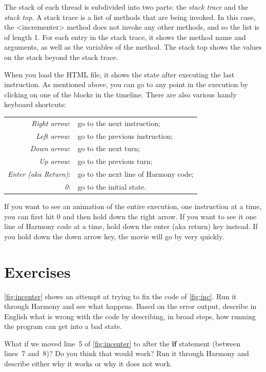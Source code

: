 \documentclass{report}
\begin{document}
The stack of each thread is subdivided into two parts: the
\emph{stack trace} and the \emph{stack top}.
A stack trace is a list of methods that are being invoked.
In this case, the <{incrementer}> method does not invoke any
other methods, and so the list is of length 1.
For each entry in the stack trace, it shows the method name and
arguments, as well as the variables of the method.
The stack top shows the values on the stack beyond the stack trace.

When you load the HTML file, it shows the state after executing
the last instruction.
As mentioned above, you can go to any point in the execution by
clicking on one of the blocks in the timeline.
There are also various handy keyboard shortcuts:
\begin{tabular}{rl}
\emph{Right arrow}: & go to the next instruction; \\
\emph{Left arrow}: & go to the previous instruction; \\
\emph{Down arrow}: & go to the next turn; \\
\emph{Up arrow}: & go to the previous turn; \\
\emph{Enter (aka Return)}: & go to the next line of Harmony code; \\
\emph{0}: & go to the initial state.
\end{tabular}

If you want to see an animation of the entire execution, one instruction
at a time, you can first hit 0 and then hold down the right arrow.
If you want to see it one line of Harmony code at a time, hold down the
enter (aka return) key instead.
If you hold down the down arrow key, the movie will
go by very quickly.

\section*{Exercises}

\begin{problems}
\item \autoref{fig:incenter} shows an attempt at trying to fix the code of
    \autoref{fig:inc}.  Run it through Harmony and see what happens.  Based on
    the error output, describe in English what is wrong with the code by describing,
    in broad steps, how running the program can get into a bad state.
\item What if we moved line~5 of \autoref{fig:incenter} to after the \textbf{if}
    statement (between lines~7 and~8)?  Do you think that would work?  Run it through
    Harmony and describe either why it works or why it does not work.
\end{problems}
\end{document}
